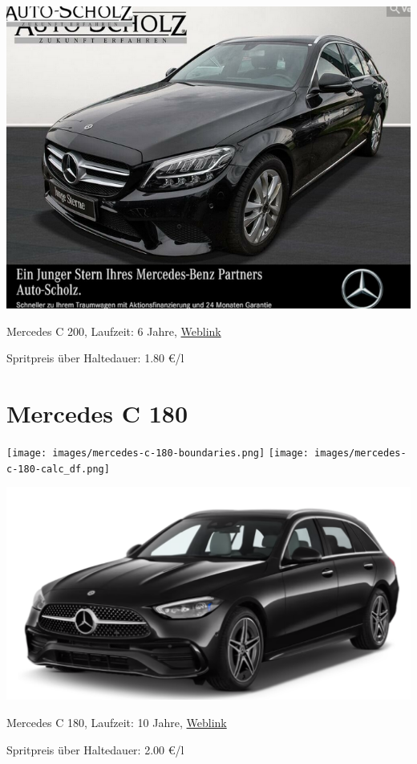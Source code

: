 \documentclass[landscape, DIV=99, 14pt]{scrartcl}
\begin{document}
\pagebreak
\null
\vspace{2cm}
\begin{center}
\includegraphics[width=0.9\columnwidth]{cars/mercedes-c-200-t.png}

Mercedes C 200, Laufzeit: 6 Jahre, \href{https://suchen.mobile.de/fahrzeuge/details.html?action=parkItem&id=327113608}{Weblink}

Spritpreis \"uber Haltedauer: 1.80 \euro{}/l

\end{center}

\pagebreak


\twocolumn

\section*{Mercedes C 180}
\begin{center}
\texttt{[image: images/mercedes-c-180-boundaries.png]}
\null
\vspace{0.5cm}
\texttt{[image: images/mercedes-c-180-calc\_df.png]}
\end{center}

\pagebreak
\null
\vspace{2cm}
\begin{center}
\includegraphics[width=0.9\columnwidth]{cars/mercedes-c-180-t.png}

Mercedes C 180, Laufzeit: 10 Jahre, \href{https://konfigurator.meinauto.de/mercedes/neuwagen/c-klasse/angebote/c-klasse-t-modell/konfigurator/\#!/preisvergleich/-/8866563/2,47,74,81/private/43735-7309-290394/349/61d36ce4c3067/cash-purchase/73169--190162/48,0,10000,0,0,0,0,0,}{Weblink}

Spritpreis \"uber Haltedauer: 2.00 \euro{}/l

\end{center}
\end{document}
